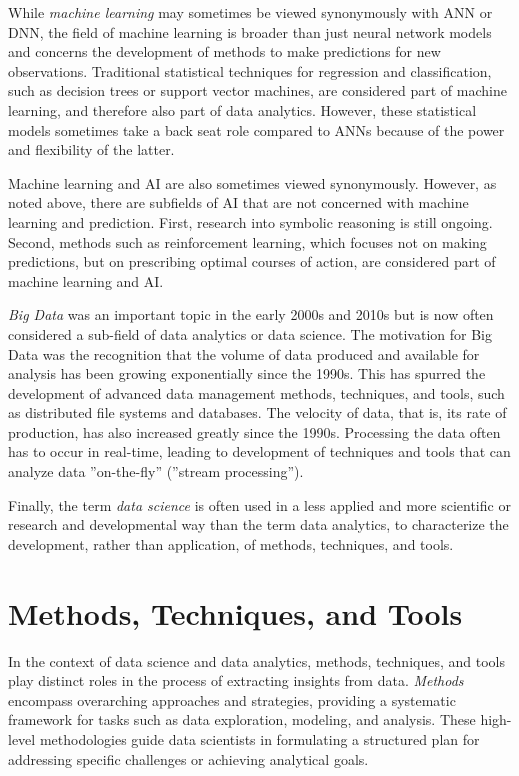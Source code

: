 While \emph{machine learning} may sometimes be viewed synonymously with ANN or DNN, the field of machine learning is broader than just neural network models and concerns the development of methods to make predictions for new observations. Traditional statistical techniques for regression and classification, such as decision trees or support vector machines, are considered part of machine learning, and therefore also part of data analytics. However, these statistical models sometimes take a back seat role compared to ANNs because of the power and flexibility of the latter. 

Machine learning and AI are also sometimes viewed synonymously. However, as noted above, there are subfields of AI that are not concerned with machine learning and prediction. First, research into symbolic reasoning is still ongoing. Second, methods such as reinforcement learning, which focuses not on making predictions, but on prescribing optimal courses of action, are considered part of machine learning and AI.

\emph{Big Data} was an important topic in the early 2000s and 2010s but is now often considered a sub-field of data analytics or data science. The motivation for Big Data was the recognition that the volume of data produced and available for analysis has been growing exponentially since the 1990s. This has spurred the development of advanced data management methods, techniques, and tools, such as distributed file systems and databases. The velocity of data, that is, its rate of production, has also increased greatly since the 1990s. Processing the data often has to occur in real-time, leading to development of techniques and tools that can analyze data ''on-the-fly'' (''stream processing'').

Finally, the term \emph{data science} is often used in a less applied and more scientific or research and developmental way than the term data analytics, to characterize the development, rather than application, of methods, techniques, and tools.

\section{Methods, Techniques, and Tools}

In the context of data science and data analytics, methods, techniques, and tools play distinct roles in the process of extracting insights from data. \emph{Methods} encompass overarching approaches and strategies, providing a systematic framework for tasks such as data exploration, modeling, and analysis. These high-level methodologies guide data scientists in formulating a structured plan for addressing specific challenges or achieving analytical goals.

